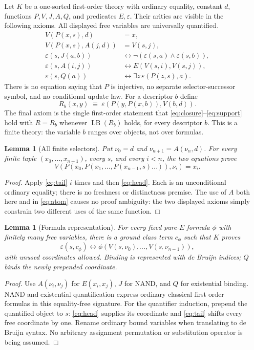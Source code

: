 \documentclass[11pt]{article}
\newtheorem{lemma}[theorem]{Lemma}
\newcommand{\eps}{\varepsilon}
\newcommand{\LB}{\operatorname{LB}}
\begin{document}
Let $K$ be a one-sorted first-order theory with ordinary equality, constant $d$, functions $P,V,J,A,Q$, and predicates $E,\eps$. Their arities are visible in the following axioms. All displayed free variables are universally quantified.
\begin{align}
 V(P(x,s),d)&=x,\label{eq:head}\\
 V(P(x,s),A(j,d))&=V(s,j),\label{eq:tail}\\
 \eps(s,J(a,b))&\leftrightarrow\neg(\eps(s,a)\land\eps(s,b)),\label{eq:nand}\\
 \eps(s,A(i,j))&\leftrightarrow E(V(s,i),V(s,j)),\label{eq:atom}\\
 \eps(s,Q(a))&\leftrightarrow\exists z\,\eps(P(z,s),a).\label{eq:exists}
\end{align}
There is no equation saying that $P$ is injective, no separate selector-successor symbol, and no conditional update law. For a descriptor $b$ define
\[
 R_b(x,y)\;\equiv\;
 \eps(P(y,P(x,b)),V(b,d)).\label{eq:rho}
\]
The final axiom is the single first-order statement that
\eqref{eq:closure}--\eqref{eq:support} hold with $R=R_b$ whenever
$\LB(R_b)$ holds, for every descriptor $b$. This is a finite theory: the variable $b$ ranges over objects, not over formulas.

\begin{lemma}[All finite selectors]
Put $\nu_0=d$ and $\nu_{n+1}=A(\nu_n,d)$. For every finite tuple
$(x_0,\ldots,x_{n-1})$, every $s$, and every $i<n$, the two equations prove
\[
 V(P(x_0,P(x_1,\ldots,P(x_{n-1},s)\ldots)),\nu_i)=x_i.
\]
\end{lemma}
\begin{proof}
Apply \eqref{eq:tail} $i$ times and then \eqref{eq:head}. Each is an unconditional ordinary equality; there is no freshness or distinctness premise. The use of $A$ both here and in \eqref{eq:atom} causes no proof ambiguity: the two displayed axioms simply constrain two different uses of the same function.
\end{proof}

\begin{lemma}[Formula representation]
For every fixed pure-$E$ formula $\phi$ with finitely many free variables, there is a ground class term $c_\phi$ such that $K$ proves
\[
 \eps(s,c_\phi)\leftrightarrow
 \phi(V(s,\nu_0),\ldots,V(s,\nu_{n-1})),
\]
with unused coordinates allowed. Binding is represented with de Bruijn indices; $Q$ binds the newly prepended coordinate.
\end{lemma}
\begin{proof}
Use $A(\nu_i,\nu_j)$ for $E(x_i,x_j)$, $J$ for NAND, and $Q$ for existential binding. NAND and existential quantification express ordinary classical first-order formulas in this equality-free signature. For the quantifier induction, prepend the quantified object to $s$: \eqref{eq:head} supplies its coordinate and \eqref{eq:tail} shifts every free coordinate by one. Rename ordinary bound variables when translating to de Bruijn syntax. No arbitrary assignment permutation or substitution operator is being assumed.
\end{proof}
\end{document}
